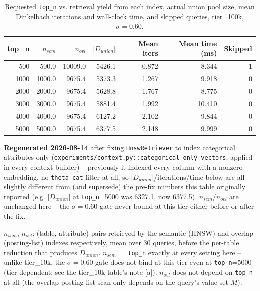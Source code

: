 \begin{table}[t]
\centering
\begin{threeparttable}
\caption{Requested \texttt{top\_n} vs. retrieval yield from each index, actual union pool size, mean Dinkelbach iterations and wall-clock time, and skipped queries, tier\_100k, $\sigma=0.60$.}
\label{tab:topn-vs-dunion-tier100k}
\begin{tabular}{rrrrrrr}
\toprule
top\_n & $n_{sem}$\tnote{a} & $n_{ovl}$\tnote{a} & $|D_{union}|$\tnote{b} & Mean iters\tnote{c} & Mean time (ms)\tnote{c} & Skipped\tnote{d} \\
\midrule
500 & 500.0 & 10009.0 & 5426.1 & 0.872 & 8.344 & 1 \\
1000 & 1000.0 & 9675.4 & 5373.3 & 1.267 & 9.918 & 0 \\
2000 & 2000.0 & 9675.4 & 5628.8 & 1.767 & 8.775 & 0 \\
3000 & 3000.0 & 9675.4 & 5881.4 & 1.992 & 10.410 & 0 \\
4000 & 4000.0 & 9675.4 & 6127.2 & 2.102 & 9.844 & 0 \\
5000 & 5000.0 & 9675.4 & 6377.5 & 2.148 & 9.999 & 0 \\
\bottomrule
\end{tabular}
\begin{tablenotes}
\footnotesize
\item[e] \textbf{Regenerated 2026-08-14} after fixing \texttt{HnswRetriever} to index categorical
  attributes only (\texttt{experiments/context.py::categorical\_only\_vectors}, applied in every
  context builder) -- previously it indexed every column with a nonzero embedding, no
  \texttt{theta\_cat} filter at all, so $|D_{union}|$/iterations/time below are all slightly
  different from (and supersede) the pre-fix numbers this table originally reported (e.g.
  $|D_{union}|$ at \texttt{top\_n}=5000 was 6327.1, now 6377.5). $n_{sem}$/$n_{ovl}$ are unchanged
  here -- the $\sigma=0.60$ gate never bound at this tier either before or after the fix.
\item[a] $n_{sem}$, $n_{ovl}$: (table, attribute) pairs retrieved by the semantic (HNSW) and overlap (posting-list) indexes respectively, mean over 30 queries, before the per-table reduction that produces $D_{union}$. $n_{sem} = $ \texttt{top\_n} exactly at every setting here -- unlike tier\_10k, the $\sigma=0.60$ gate does not bind at this tier even at \texttt{top\_n}=5000 (tier-dependent; see the tier\_10k table's note [a]). $n_{ovl}$ does not depend on \texttt{top\_n} at all (the overlap posting-list scan only depends on the query's value set $M$).

\end{tablenotes}
\end{threeparttable}
\end{table}
